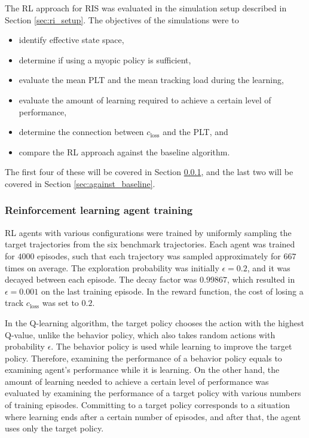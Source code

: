 \documentclass[english, 12pt, a4paper, elec, utf8, a-1b, online]{aaltothesis}
\numberwithin{equation}{section}
\newcommand{\closs}{c_\text{loss}}
\begin{document}
The RL approach for RIS was evaluated in the simulation setup described in Section \ref{sec:ri_setup}.
The objectives of the simulations were to
\begin{itemize}
    \item identify effective state space,
    \item determine if using a myopic policy is sufficient,
    \item evaluate the mean PLT and the mean tracking load during the learning,
    \item evaluate the amount of learning required to achieve a certain level of performance,
    \item determine the connection between $\closs$ and the PLT, and
    \item compare the RL approach against the baseline algorithm.
\end{itemize}
The first four of these will be covered in Section \ref{sec:training}, and the last two will be covered in Section \ref{sec:against_baseline}.

\subsubsection{Reinforcement learning agent training}\label{sec:training}

RL agents with various configurations were trained by uniformly sampling the target trajectories from the six benchmark trajectories.
Each agent was trained for $4000$ episodes, such that each trajectory was sampled approximately for $667$ times on average.
The exploration probability was initially $\epsilon=0.2$, and it was decayed between each episode. The decay factor was $0.99867$, which resulted in $\epsilon=0.001$ on the last training episode.
In the reward function, the cost of losing a track $\closs$ was set to $0.2$.

In the Q-learning algorithm, the target policy chooses the action with the highest Q-value, unlike the behavior policy, which also takes random actions with probability $ \epsilon $.
The behavior policy is used while learning to improve the target policy.
Therefore, examining the performance of a behavior policy equals to examining agent's performance while it is learning.
On the other hand, the amount of learning needed to achieve a certain level of performance was evaluated by examining the performance of a  target policy with various numbers of training episodes.
Committing to a target policy corresponds to a situation where learning ends after a certain number of episodes, and after that, the agent uses only the target policy.
\end{document}
